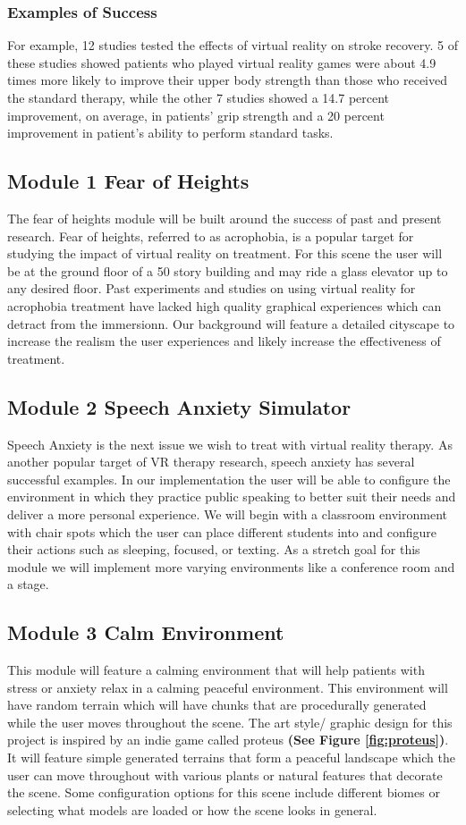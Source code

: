 \documentclass[a4paper,10pt,twoside]{article}
\begin{document}
\subsubsection{Examples of Success}
For example, 12 studies tested the effects of virtual reality on stroke recovery. 5 of these studies showed patients who played virtual reality games were about 4.9 times more likely to improve their upper body strength than those who received the standard therapy, while the other 7  studies showed a 14.7 percent improvement, on average, in patients' grip strength and a 20 percent improvement in patient's ability to perform standard tasks.\cite{stroke1}
\pagebreak
\subsection{Module 1 Fear of Heights}
The fear of heights module will be built around the success of past and present research. Fear of heights, referred to as acrophobia, is a popular target for studying the impact of virtual reality on treatment. For this scene the user will be at the ground floor of a 50 story building and may ride a glass elevator up to any desired floor. Past experiments and studies on using virtual reality for acrophobia treatment have lacked high quality graphical experiences which can detract from the immersionn. Our background will feature a detailed cityscape to increase the realism the user experiences and likely increase the effectiveness of treatment.
\pagebreak
\subsection{Module 2 Speech Anxiety Simulator}
Speech Anxiety is the next issue we wish to treat with virtual reality therapy. As another popular target of VR therapy research, speech anxiety has several successful examples. In our implementation the user will be able to configure the environment in which they practice public speaking to better suit their needs and deliver a more personal experience. We will begin with a classroom environment with chair spots which the user can place different students into and configure their actions such as sleeping, focused, or texting. As a stretch goal for this module we will implement more varying environments like a conference room and a stage.
\pagebreak
\subsection{Module 3 Calm Environment} %
This module will feature a calming environment that will help patients with stress or anxiety relax in a calming peaceful environment. This environment will have random terrain which will have chunks 
that are procedurally generated while the user moves throughout the scene.  The art style/ graphic design for this project is inspired by an indie game called proteus \textbf{(See Figure \ref{fig:proteus})}. 
It will feature simple generated terrains that form a  peaceful landscape which the user can move throughout with various plants or natural features that decorate the scene. 
Some configuration options for this scene include different biomes or selecting what models are loaded or how the scene looks in general. 
\end{document}
